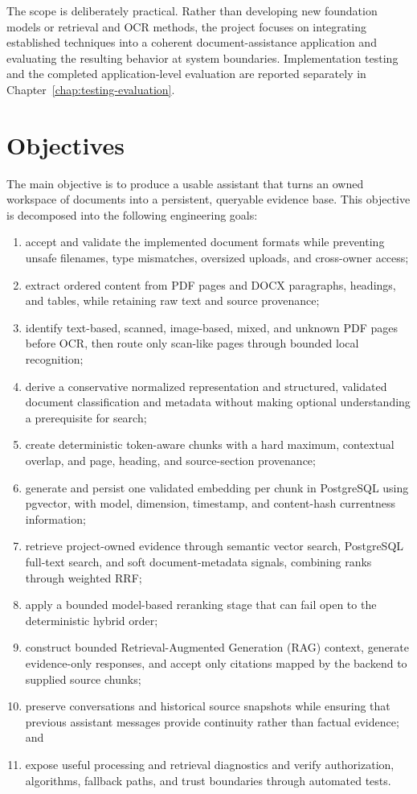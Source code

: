 The scope is deliberately practical. Rather than developing new foundation models or retrieval and OCR methods, the project focuses on integrating established techniques into a coherent document-assistance application and evaluating the resulting behavior at system boundaries. Implementation testing and the completed application-level evaluation are reported separately in Chapter~\ref{chap:testing-evaluation}.

\section{Objectives}
\label{sec:introduction-objectives}

The main objective is to produce a usable assistant that turns an owned workspace of documents into a persistent, queryable evidence base. This objective is decomposed into the following engineering goals:

\begin{enumerate}
    \item accept and validate the implemented document formats while preventing unsafe filenames, type mismatches, oversized uploads, and cross-owner access;
    \item extract ordered content from PDF pages and DOCX paragraphs, headings, and tables, while retaining raw text and source provenance;
    \item identify text-based, scanned, image-based, mixed, and unknown PDF pages before OCR, then route only scan-like pages through bounded local recognition;
    \item derive a conservative normalized representation and structured, validated document classification and metadata without making optional understanding a prerequisite for search;
    \item create deterministic token-aware chunks with a hard maximum, contextual overlap, and page, heading, and source-section provenance;
    \item generate and persist one validated embedding per chunk in PostgreSQL using pgvector, with model, dimension, timestamp, and content-hash currentness information;
    \item retrieve project-owned evidence through semantic vector search, PostgreSQL full-text search, and soft document-metadata signals, combining ranks through weighted RRF;
    \item apply a bounded model-based reranking stage that can fail open to the deterministic hybrid order;
    \item construct bounded Retrieval-Augmented Generation (RAG) context, generate evidence-only responses, and accept only citations mapped by the backend to supplied source chunks;
    \item preserve conversations and historical source snapshots while ensuring that previous assistant messages provide continuity rather than factual evidence; and
    \item expose useful processing and retrieval diagnostics and verify authorization, algorithms, fallback paths, and trust boundaries through automated tests.
\end{enumerate}

